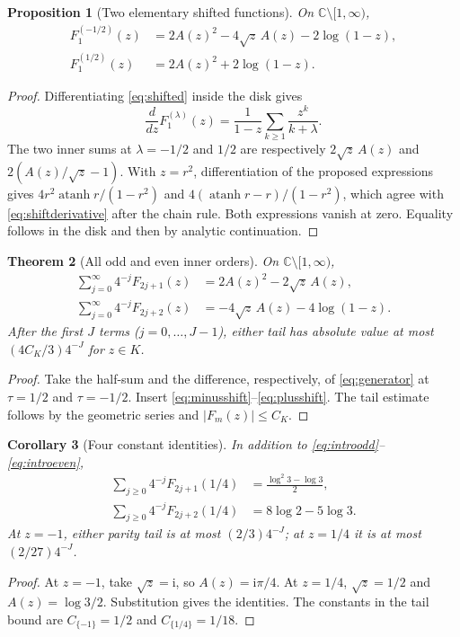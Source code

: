 \documentclass[11pt]{article}
\numberwithin{equation}{section}
\newtheorem{theorem}{Theorem}[section]
\newtheorem{proposition}[theorem]{Proposition}
\newtheorem{corollary}[theorem]{Corollary}
\theoremstyle{definition}
\theoremstyle{remark}
\DeclareMathOperator{\atanh}{atanh}
\newcommand{\ii}{\mathrm i}
\newcommand{\C}{\mathbb C}
\newcommand{\cut}{\C\setminus[1,\infty)}
\begin{document}
\begin{proposition}[Two elementary shifted functions]\label{prop:halfshift}
On $\cut$,
\begin{align}
 F_1^{(-1/2)}(z)
       &=2A(z)^2-4\sqrt z\,A(z)-2\log(1-z),\label{eq:minusshift}\\
 F_1^{(1/2)}(z)
       &=2A(z)^2+2\log(1-z).\label{eq:plusshift}
\end{align}
\end{proposition}
\begin{proof}
Differentiating \eqref{eq:shifted} inside the disk gives
\begin{equation}\label{eq:shiftderivative}
 \frac d{dz}F_1^{(\lambda)}(z)
 =\frac1{1-z}\sum_{k\ge1}\frac{z^k}{k+\lambda}.
\end{equation}
The two inner sums at $\lambda=-1/2$ and $1/2$ are respectively
$2\sqrt z\,A(z)$ and $2(A(z)/\sqrt z-1)$.
With $z=r^2$, differentiation of the proposed expressions gives
$4r^2\atanh r/(1-r^2)$ and $4(\atanh r-r)/(1-r^2)$,
which agree with \eqref{eq:shiftderivative} after the chain rule.
Both expressions vanish at zero. Equality follows in the disk and
then by analytic continuation.
\end{proof}

\begin{theorem}[All odd and even inner orders]\label{thm:parity}
On $\cut$,
\begin{align}
 \sum_{j=0}^{\infty}4^{-j}F_{2j+1}(z)
       &=2A(z)^2-2\sqrt z\,A(z),\label{eq:oddidentity}\\
 \sum_{j=0}^{\infty}4^{-j}F_{2j+2}(z)
       &=-4\sqrt z\,A(z)-4\log(1-z).\label{eq:evenidentity}
\end{align}
After the first $J$ terms ($j=0,\ldots,J-1$), either tail has
absolute value at most $(4C_K/3)4^{-J}$ for $z\in K$.
\end{theorem}
\begin{proof}
Take the half-sum and the difference, respectively, of
\eqref{eq:generator} at $\tau=1/2$ and $\tau=-1/2$.
Insert \eqref{eq:minusshift}--\eqref{eq:plusshift}. The tail estimate
follows by the geometric series and $|F_m(z)|\le C_K$.
\end{proof}

\begin{corollary}[Four constant identities]\label{cor:constants}
In addition to \eqref{eq:introodd}--\eqref{eq:introeven},
\begin{align}
 \sum_{j\ge0}4^{-j}F_{2j+1}(1/4)
       &=\frac{\log^2 3-\log3}{2},\label{eq:quarterodd}\\
 \sum_{j\ge0}4^{-j}F_{2j+2}(1/4)
       &=8\log2-5\log3.\label{eq:quartereven}
\end{align}
At $z=-1$, either parity tail is at most $(2/3)4^{-J}$; at $z=1/4$
it is at most $(2/27)4^{-J}$.
\end{corollary}
\begin{proof}
At $z=-1$, take $\sqrt z=\ii$, so $A(z)=\ii\pi/4$.
At $z=1/4$, $\sqrt z=1/2$ and $A(z)=\log3/2$.
Substitution gives the identities. The constants in the tail bound
are $C_{\{-1\}}=1/2$ and $C_{\{1/4\}}=1/18$.
\end{proof}
\end{document}
